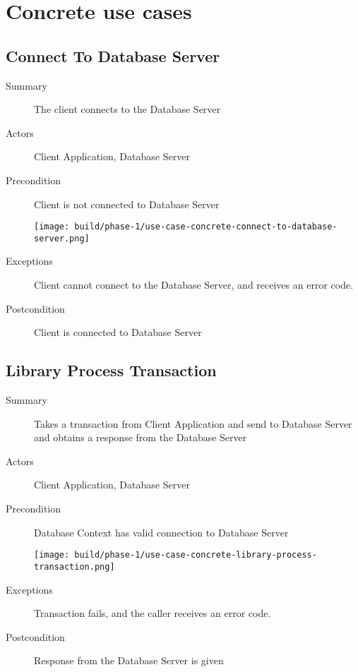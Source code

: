 \documentclass[a4paper]{report}
\begin{document}
	\pagebreak
	
\section{Concrete use cases}

	\subsection{Connect To Database Server}

	\begin{description}
		\item[Summary] The client connects to the Database Server
		\item[Actors] Client Application, Database Server
		\item[Precondition] Client is not connected to Database Server

		\begin{center}
			\texttt{[image: build/phase-1/use-case-concrete-connect-to-database-server.png]}
		\end{center}

		\item[Exceptions] Client cannot connect to the Database Server, and receives an error code.
		\item[Postcondition] Client is connected to Database Server
	\end{description}

	\pagebreak
	
	\subsection{Library Process Transaction}

	\begin{description}
		\item[Summary] Takes a transaction from Client Application and send to Database Server and obtains a response from the Database Server
		\item[Actors] Client Application, Database Server
		\item[Precondition] Database Context has valid connection to Database Server

		\begin{center}
			\texttt{[image: build/phase-1/use-case-concrete-library-process-transaction.png]}
		\end{center}

		\item[Exceptions] Transaction fails, and the caller receives an error code.
		\item[Postcondition] Response from the Database Server is given
	\end{description}
	
\end{document}
